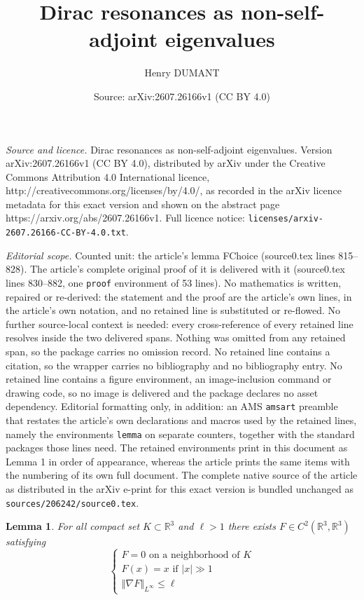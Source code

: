 \documentclass[10pt,a4paper]{amsart}
\title{Dirac resonances as non-self-adjoint eigenvalues}
\author{Henry DUMANT}
\date{Source: arXiv:2607.26166v1 (CC BY 4.0)}
\newtheorem{lemma}{Lemma}
\newcommand{\R}{\mathbb{R}} %
\newcommand{\lV}{\left\Vert} %
\newcommand{\lv}{\left\vert} %
\newcommand{\rV}{\right\Vert} %
\newcommand{\rv}{\right\vert} %
\begin{document}
\maketitle

\noindent\emph{Source and licence.} Dirac resonances as non-self-adjoint eigenvalues. Version arXiv:2607.26166v1 (CC BY 4.0), distributed by arXiv under the Creative Commons Attribution 4.0 International licence, http://creativecommons.org/licenses/by/4.0/, as recorded in the arXiv licence metadata for this exact version and shown on the abstract page https://arxiv.org/abs/2607.26166v1. Full licence notice: \texttt{licenses/arxiv-2607.26166-CC-BY-4.0.txt}.\par\smallskip

\noindent\textit{Editorial scope.} Counted unit: the article's lemma FChoice (source0.tex lines 815--828). The article's complete original proof of it is delivered with it (source0.tex lines 830--882, one \texttt{proof} environment of 53 lines). No mathematics is written, repaired or re-derived: the statement and the proof are the article's own lines, in the article's own notation, and no retained line is substituted or re-flowed.  No further source-local context is needed: every cross-reference of every retained line resolves inside the two delivered spans.  Nothing was omitted from any retained span, so the package carries no omission record.  No retained line contains a citation, so the wrapper carries no bibliography and no bibliography entry.  No retained line contains a figure environment, an image-inclusion command or drawing code, so no image is delivered and the package declares no asset dependency.  Editorial formatting only, in addition: an AMS \texttt{amsart} preamble that restates the article's own declarations and macros used by the retained lines, namely the environments \texttt{lemma} on separate counters, together with the standard packages those lines need.  The retained environments print in this document as Lemma 1 in order of appearance, whereas the article prints the same items with the numbering of its own full document.  The complete native source of the article as distributed in the arXiv e-print for this exact version is bundled unchanged as \texttt{sources/206242/source0.tex}.
\begin{lemma}\label{FChoice}
    For all compact set $K\subset\R^3$ and $\ell>1$ there exists $F\in C^2(\R^3,\R^3)$ satisfying
    \begin{equation*}
        \left\{
        \begin{array}{ll}
            F=0 \mbox{ on a neighborhood of } K\\

            F(x)=x \mbox{ if } \lv x\rv\gg 1\\
            
            \lV \nabla F\rV_{L^\infty}\leq\ell
        \end{array}
        \right.
    \end{equation*}
\end{lemma}
\end{document}
